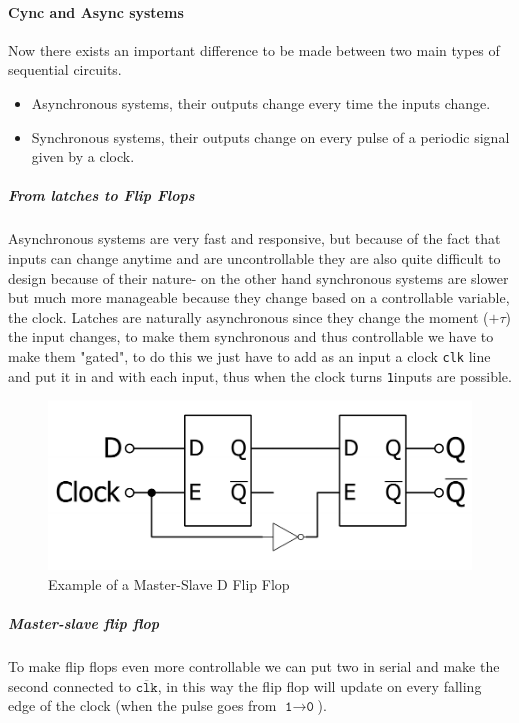 \documentclass{scrartcl}
\newcommand{\zero}{\texttt{0}}
\newcommand{\one}{\texttt{1}}
\begin{document}
    \paragraph{Cync and Async systems} Now there exists an important difference to be made between two main types of sequential circuits.
    \begin{itemize}
        \item Asynchronous systems, their outputs change every time the inputs change.
        \item Synchronous systems, their outputs change on every pulse of a periodic signal given by a clock.
    \end{itemize}
    \subparagraph{From latches to Flip Flops}
    Asynchronous systems are very fast and responsive, but because of the fact that inputs can change anytime and are uncontrollable they are also quite difficult to design because of their nature- on the other hand synchronous systems are slower but much more manageable because they change based on a controllable variable, the clock.
    Latches are naturally asynchronous since they change the moment ($+ \tau$) the input changes, to make them synchronous and thus controllable we have to make them "gated", to do this we just have to add as an input a clock \texttt{clk} line and put it in and with each input, thus when the clock turns \one inputs are possible.
    \begin{figure}
        \begin{center}
            \includegraphics[scale=0.5]{D_FF.pdf}
        \end{center}
        \caption{Example of a Master-Slave D Flip Flop}
    \end{figure}
    \subparagraph{Master-slave flip flop} To make flip flops even more controllable we can put two in serial and make the second connected to $\overline{\texttt{clk}}$, in this way the flip flop will update on every falling edge of the clock (when the pulse goes from $\one\to\zero$).
\end{document}
